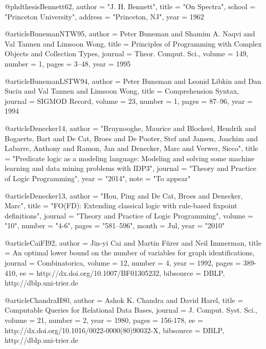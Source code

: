 \documentclass{article}
\begin{document}
@phdthesis{Bennett62,
  author    = "J. H. Bennett",
  title     = "On Spectra",
  school    = "Princeton University",
  address   = "Princeton, NJ",
  year      = 1962
}

@article{BunemanNTW95,
  author    = {Peter Buneman and
               Shamim A. Naqvi and
               Val Tannen and
               Limsoon Wong},
  title     = {Principles of Programming with Complex Objects and Collection Types},
  journal   = {Theor. Comput. Sci.},
  volume    = {149},
  number    = {1},
  pages     = {3--48},
  year      = {1995}
}

@article{BunemanLSTW94,
  author    = {Peter Buneman and
               Leonid Libkin and
               Dan Suciu and
               Val Tannen and
               Limsoon Wong},
  title     = {Comprehension Syntax},
  journal   = {{SIGMOD} Record},
  volume    = {23},
  number    = {1},
  pages     = {87--96},
  year      = {1994}
}


@article{Denecker14,
  author = "Bruynooghe, Maurice and Blockeel, Hendrik and Bogaerts, Bart and De Cat, Broes and De Pooter, Stef and Jansen, Joachim and Labarre, Anthony and Ramon, Jan and Denecker, Marc and Verwer, Sicco",
  title = "Predicate logic as a modeling language: {M}odeling and solving some machine learning and data mining problems with {IDP}3",
  journal = "Theory and Practice of Logic Programming",
  year = "2014",
  note = "To appear"
}

@article{Denecker13,
  author = "Hou, Ping and De Cat, Broes and Denecker, Marc",
  title = "{FO}({FD}): {E}xtending classical logic with rule-based fixpoint definitions",
  journal = "Theory and Practice of Logic Programming",
  volume = "10",
  number = "4-6",
  pages = "581--596",
  month = Jul,
  year = "2010"
}


@article{CaiFI92,
  author    = {{Jin-yi} Cai and
               Martin F{\"u}rer and
               Neil Immerman},
  title     = {An optimal lower bound on the number of variables for graph
               identifications},
  journal   = {Combinatorica},
  volume    = {12},
  number    = {4},
  year      = {1992},
  pages     = {389-410},
  ee        = {http://dx.doi.org/10.1007/BF01305232},
  bibsource = {DBLP, http://dblp.uni-trier.de}
}

@article{ChandraH80,
  author    = {Ashok K. Chandra and
               David Harel},
  title     = {Computable Queries for Relational Data Bases},
  journal   = {J. Comput. Syst. Sci.},
  volume    = {21},
  number    = {2},
  year      = {1980},
  pages     = {156-178},
  ee        = {http://dx.doi.org/10.1016/0022-0000(80)90032-X},
  bibsource = {DBLP, http://dblp.uni-trier.de}
}
\end{document}
